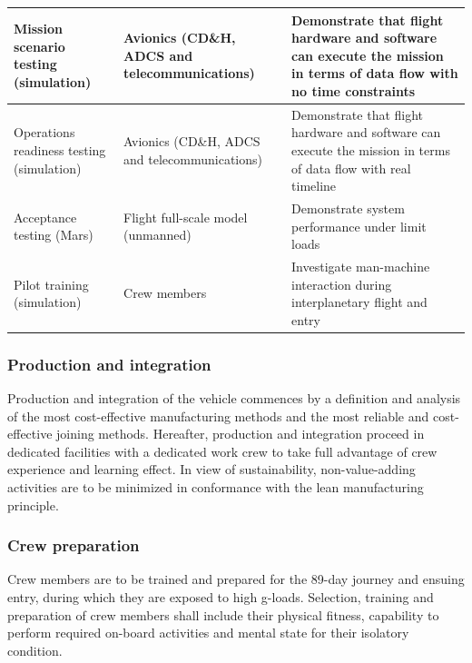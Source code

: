 \begin{table}[h]
\begin{tabular}{|p{}|p{}|p{}|}
Mission scenario testing (simulation)        & Avionics (CD\&H, ADCS and telecommunications)                                                                         & Demonstrate that flight hardware and software can execute the mission in terms of data flow with no time constraints                                                                                                              \\ \hline
Operations readiness testing (simulation)    & Avionics (CD\&H, ADCS and telecommunications)                                                                           & Demonstrate that flight hardware and software can execute the mission in terms of data flow with real timeline                                                                                                                    \\ \hline
Acceptance testing (Mars)                    & Flight full-scale model (unmanned)                                                                                      & Demonstrate system performance under limit loads                                                                                                                                                                                  \\ \hline
Pilot training (simulation) & Crew members & Investigate man-machine interaction during interplanetary flight and entry \\ \hline
\end{tabular}
\end{table}

\subsubsection{Production and integration}
Production and integration of the vehicle commences by a definition and analysis of the most cost-effective manufacturing methods and the most reliable and cost-effective joining methods. Hereafter, production and integration proceed in dedicated facilities with a dedicated work crew to take full advantage of crew experience and learning effect. In view of sustainability, non-value-adding activities are to be minimized in conformance with the lean manufacturing principle. 

\subsubsection{Crew preparation}
Crew members are to be trained and prepared for the 89-day journey and ensuing entry, during which they are exposed to high g-loads. Selection, training and preparation of crew members shall include their physical fitness, capability to perform required on-board activities and mental state for their isolatory condition.

